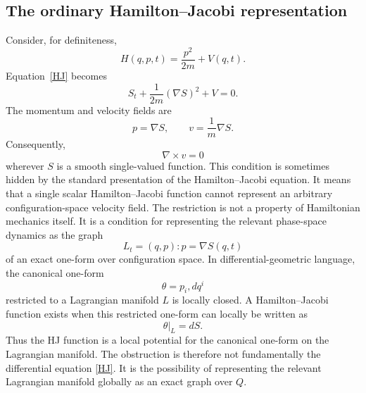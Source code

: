 \subsection{The ordinary Hamilton--Jacobi representation}
Consider, for definiteness,
\begin{equation}
H(q,p,t)=\frac{p^2}{2m}+V(q,t).
\end{equation}
Equation~\eqref{HJ} becomes
\begin{equation}
S_t+\frac{1}{2m}(\nabla S)^2+V=0.
\end{equation}
The momentum and velocity fields are
\begin{equation}
p=\nabla S,
\qquad
v=\frac{1}{m}\nabla S.
\label{gradientvelocity}
\end{equation}
Consequently,
\begin{equation}
\nabla\times v=0
\label{irrotational}
\end{equation}
wherever \(S\) is a smooth single-valued function.
This condition is sometimes hidden by the standard presentation of the
Hamilton--Jacobi equation.  It means that a single scalar Hamilton--Jacobi
function cannot represent an arbitrary configuration-space velocity field.
The restriction is not a property of Hamiltonian mechanics itself.  It is a
condition for representing the relevant phase-space dynamics as the graph
\begin{equation}
L_t={(q,p):p=\nabla S(q,t)}
\end{equation}
of an exact one-form over configuration space.
In differential-geometric language, the canonical one-form
\begin{equation}
\theta=p_i,dq^i
\end{equation}
restricted to a Lagrangian manifold \(L\) is locally closed.  A Hamilton--Jacobi
function exists when this restricted one-form can locally be written as
\begin{equation}
\theta|_L=dS.
\end{equation}
Thus the HJ function is a local potential for the canonical one-form on the
Lagrangian manifold.
The obstruction is therefore not fundamentally the differential equation
\eqref{HJ}.  It is the possibility of representing the relevant Lagrangian
manifold globally as an exact graph over \(Q\).
